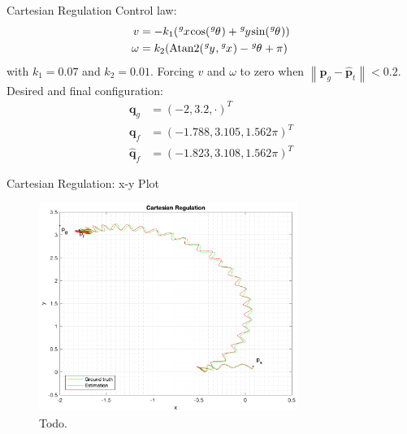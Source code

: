 \documentclass[10pt]{beamer}
\begin{document}
    \begin{frame}{Cartesian Regulation}
        \justifying
        Control law:
        \begin{align*}
            v &= -k_1 (\tensor[^g]{x}{} \text{cos}(\tensor[^g]{\theta}{}) + \tensor[^g]{y}{} \text{sin}(\tensor[^g]{\theta}{})) \\
            \omega &=  k_2 (\text{Atan2}(\tensor[^g]{y}{}, \tensor[^g]{x}{}) - \tensor[^g]{\theta}{} + \pi)
        \end{align*}
        with $k_1 = 0.07$ and $k_2 = 0.01$. Forcing $v$ and $\omega$ to zero when
        $\left\|\bm{p}_g - \bm{\hat{p}}_t \right\| < 0.2$.
        Desired and final configuration:
        \begin{align*}
            \bm{q}_g &= (-2, 3.2, \cdot)^T \\
            \bm{q}_f &= (-1.788, 3.105, 1.562\pi)^T \\
            \bm{\hat{q}}_f &= (-1.823, 3.108, 1.562\pi)^T
        \end{align*}
    \end{frame}

    \begin{frame}{Cartesian Regulation: x-y Plot}
        \begin{figure}
            \caption{Todo.}
            \includegraphics[width=0.75\textwidth]{images/cartesian_regulation.png}
        \end{figure}
    \end{frame}
\end{document}
